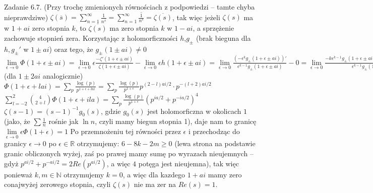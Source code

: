 \documentclass{article}
\begin{document}
Zadanie 6.7.
\newline
\newline
(Przy trochę zmienionych równościach z podpowiedzi -- tamte chyba nieprawdziwe)\newline
$\zeta(\overline{s})=\sum\limits_{n=1}^{\infty}\frac{1}{n^{\overline{s}}}=\sum\limits_{n=1}^{\infty}\overline{\frac{1}{n^{s}}}=\overline{\zeta(s)}$,
tak więc jeżeli $\zeta(s)$ ma w $1+ai$ zero stopnia $k$, to $\overline{\zeta(s)}$ ma zero stopnia $k$ w $1-ai$, a sprzężenie zachowuje stopnień zera.\newline
Korzystając z holomorficzności $h$,$g_{\pm}$ (brak bieguna dla $h,g_{\pm}'$ w $1\pm ai$) oraz tego, że $g_{\pm}(1\pm ai)\neq 0$\newline
$\lim\limits_{\epsilon\rightarrow0}\Phi(1+\epsilon\pm ai)=
\lim\limits_{\epsilon\rightarrow0}\epsilon\frac{-\zeta'(1+\epsilon\pm ai)}{\zeta(1+\epsilon \pm ai)}-\lim\limits_{\epsilon\rightarrow0}\epsilon h(1+\epsilon\pm ai)=
\lim\limits_{\epsilon\rightarrow0}\frac{(-\epsilon^kg_{\pm}(1+\epsilon\pm ai))'}{\epsilon^{k-1}g_{\pm}(1+\epsilon\pm ai)}-0=
\lim\limits_{\epsilon\rightarrow0}\frac{-k\epsilon^{k-1}g_{\pm}(1+\epsilon\pm ai)-\epsilon^kg_{\pm}'(1+\epsilon\pm ai)}{\epsilon^{k-1}g_{\pm}(1+\epsilon\pm ai)}=
\lim\limits_{\epsilon\rightarrow0}(-k-\epsilon\frac{g_{\pm}'(1+\epsilon\pm ai)}{g_{\pm}(1+\epsilon\pm ai)})=-k$ (dla $1\pm 2ai$ analogicznie)\newline
$\Phi(1+\epsilon+lai)=\sum\limits_{p}\frac{\log(p)}{p^{1+\epsilon+lai}}=\sum\limits_{p}\frac{\log(p)}{p^{1+\epsilon}}p^{(2-l)ai/2}\cdot p^{-(l+2)ai/2}$\newline
$\sum\limits_{l=-2}^{2}{4 \choose 2+l}\Phi(1+\epsilon+ila)=\sum\limits_{p}\frac{\log(p)}{p^{1+\epsilon}}(p^{ia/2}+p^{-ia/2})^4$\newline
$\zeta(s-1)=(s-1)^{-1}g_0(s)$, gdzie $g_0(s)$ jest holomorficzna w okolicach $1$ (jako, że $\sum\frac{1}{n}$ rośnie jak $\ln{n}$, czyli mamy biegun stopnia 1),
daje nam to granicę $\lim\limits_{\epsilon\rightarrow 0}\epsilon\Phi(1+\epsilon)=1$\newline
Po przemnożeniu tej równości przez $\epsilon$ i przechodząc do granicy $\epsilon\rightarrow 0$ po $\epsilon\in\mathbb{R}$ otrzymujemy:\newline
$6-8k-2m\ge0$ (lewa strona na podstawie granic obliczonych wyżej, zaś po prawej mamy sumę po wyrazach nieujemnych --
gdyż $p^{ai/2}+p^{-ai/2}=2Re(p^{ai/2})$, a więc $4$ potęga jest nieujemna), tak więc ponieważ $k,m\in\mathbb{N}$ otrzymujemy $k=0$,
a więc dla kazdego $1+ai$ mamy zero conajwyżej zerowego stopnia, czyli $\zeta(s)$ nie ma zer na $Re(s)=1$.
\end{document}
